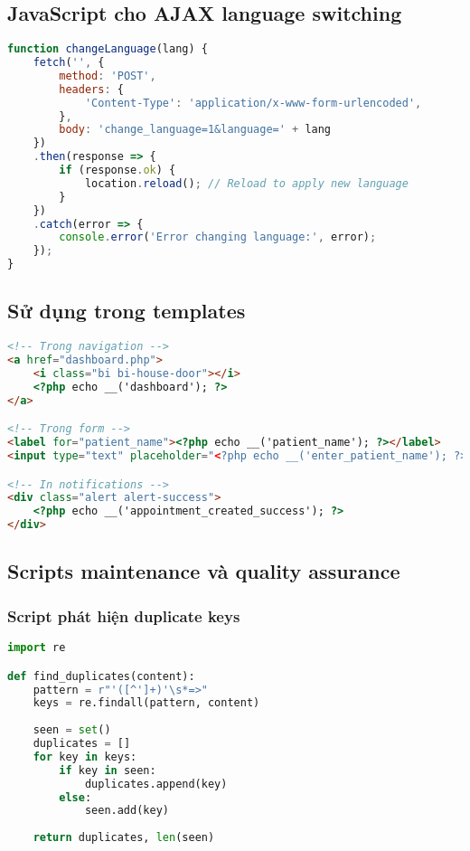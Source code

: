 \documentclass[12pt,a4paper]{report}
\begin{document}
\subsection{JavaScript cho AJAX language switching}
\begin{lstlisting}[language=JavaScript, caption=AJAX language switching]
function changeLanguage(lang) {
    fetch('', {
        method: 'POST',
        headers: {
            'Content-Type': 'application/x-www-form-urlencoded',
        },
        body: 'change_language=1&language=' + lang
    })
    .then(response => {
        if (response.ok) {
            location.reload(); // Reload to apply new language
        }
    })
    .catch(error => {
        console.error('Error changing language:', error);
    });
}
\end{lstlisting}

\subsection{Sử dụng trong templates}
\begin{lstlisting}[language=HTML, caption=Usage in templates]
<!-- Trong navigation -->
<a href="dashboard.php">
    <i class="bi bi-house-door"></i>
    <?php echo __('dashboard'); ?>
</a>

<!-- Trong form -->
<label for="patient_name"><?php echo __('patient_name'); ?></label>
<input type="text" placeholder="<?php echo __('enter_patient_name'); ?>">

<!-- In notifications -->
<div class="alert alert-success">
    <?php echo __('appointment_created_success'); ?>
</div>
\end{lstlisting}

\subsection{Scripts maintenance và quality assurance}
\subsubsection{Script phát hiện duplicate keys}
\begin{lstlisting}[language=Python, caption=analyze\_duplicates.py]
import re

def find_duplicates(content):
    pattern = r"'([^']+)'\s*=>"
    keys = re.findall(pattern, content)
    
    seen = set()
    duplicates = []
    for key in keys:
        if key in seen:
            duplicates.append(key)
        else:
            seen.add(key)
    
    return duplicates, len(seen)
\end{lstlisting}
\end{document}
